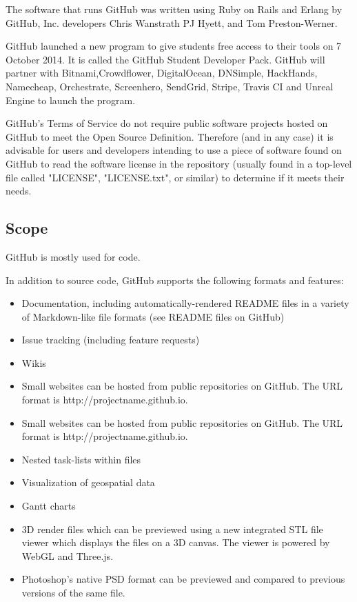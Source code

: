 \documentclass{article}\usepackage[]{graphicx}\usepackage[]{color}
\begin{document}
The software that runs GitHub was written using Ruby on Rails and Erlang by GitHub, Inc. developers Chris Wanstrath PJ Hyett, and Tom Preston-Werner. \smallskip
\par GitHub launched a new program to give students free access to their tools on 7 October 2014. It is called the GitHub Student Developer Pack. GitHub will partner with Bitnami,Crowdflower, DigitalOcean, DNSimple, HackHands, Namecheap, Orchestrate, Screenhero, SendGrid, Stripe, Travis CI and Unreal Engine to launch the program. \smallskip
\par GitHub's Terms of Service do not require public software projects hosted on GitHub to meet the Open Source Definition. Therefore (and in any case) it is advisable for users and developers intending to use a piece of software found on GitHub to read the software license in the repository (usually found in a top-level file called "LICENSE", "LICENSE.txt", or similar) to determine if it meets their needs.



\subsection*{Scope}
GitHub is mostly used for code. \smallskip

In addition to source code, GitHub supports the following formats and features:

\begin{itemize}
\item Documentation, including automatically-rendered README files in a variety of Markdown-like file formats (see README files on GitHub)
\item Issue tracking (including feature requests)
\item Wikis
\item Small websites can be hosted from public repositories on GitHub. The URL format is http://projectname.github.io.
\item Small websites can be hosted from public repositories on GitHub. The URL format is http://projectname.github.io.
\item Nested task-lists within files
\item Visualization of geospatial data
\item Gantt charts
\item 3D render files which can be previewed using a new integrated STL file viewer which displays the files on a 3D canvas. The viewer is powered by WebGL and Three.js.
\item Photoshop's native PSD format can be previewed and compared to previous versions of the same file.
\end{itemize}
\end{document}

